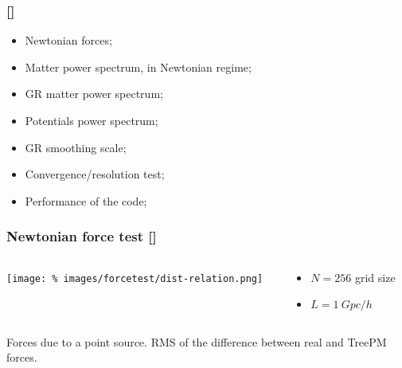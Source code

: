 \documentclass{beamer}
\makeatletter
\newcommand{\mylabel}{%
   [\beamer@againname]}
\makeatother
\begin{document}
\begin{frame}[label=testsummary]
    \frametitle{\mylabel}
    \begin{itemize}
    	\setlength\itemsep{1em}
    	\item Newtonian forces; 
	\item Matter power spectrum, in Newtonian regime;
	\item GR matter power spectrum; 
	\item Potentials power spectrum;
	\item GR smoothing scale;
	\item Convergence/resolution test;
	\item Performance of the code;
    \end{itemize}
\end{frame}

\begin{frame}[label=forcetest]
    \frametitle{Newtonian force test\mylabel}
    \vspace*{-.5cm}
    \begin{columns}
        \begin{column}{.65\textwidth}
            \centering\texttt{[image: \%
                images/forcetest/dist-relation.png]} 
        \end{column}
        \begin{column}{.35\textwidth}
            \begin{itemize}
               \item $N = 256$ grid size
               \item $L = \SI{1}{Gpc}/h$
            \end{itemize}
        \end{column}
    \end{columns}
    {\small Forces due to a point source. RMS of the difference between real and
    TreePM forces.}
\end{frame}
\end{document}
